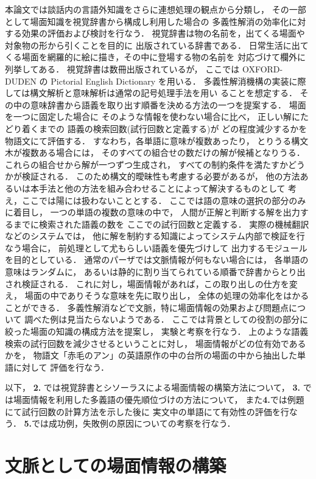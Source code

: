 本論文では談話内の言語外知識をさらに連想処理の観点から分類し，
その一部として場面知識を視覚辞書から構成し利用した場合の
多義性解消の効率化に対する効果の評価および検討を行なう．
視覚辞書は物の名前を，出てくる場面や対象物の形から引くことを目的に
出版されている辞書である．
日常生活に出てくる場面を網羅的に絵に描き，その中に登場する物の名前を
対応づけて欄外に列挙してある．
視覚辞書は数冊出版されているが，
ここでは OXFORD-DUDEN の Pictorial English Dictionary を用いる．
多義性解消機構の実装に際しては構文解析と意味解析は通常の記号処理手法を用い
ることを想定する．
その中の意味辞書から語義を取り出す順番を決める方法の一つを提案する．
場面を一つに固定した場合に
そのような情報を使わない場合に比べ，
正しい解にたどり着くまでの
語義の検索回数(試行回数と定義する)が
どの程度減少するかを物語文にて評価する．
すなわち，各単語に意味が複数あったり，
とりうる構文木が複数ある場合には，
そのすべての組合せの数だけの解が候補となりうる．
これらの組合せから解が一つずつ生成され，
すべての制約条件を満たすかどうかが検証される．
このため構文的曖昧性も考慮する必要があるが，
他の方法あるいは本手法と他の方法を組み合わせることによって解決するものとして
考え，ここでは陽には扱わないこととする．
ここでは語の意味の選択の部分のみに着目し，
一つの単語の複数の意味の中で，
人間が正解と判断する解を出力するまでに検索された語義の数を
ここでの試行回数と定義する．
実際の機械翻訳などのシステムでは，
他に解を制約する知識によってシステム内部で検証を行なう場合に，
前処理として尤もらしい語義を優先づけして
出力するモジュールを目的としている．
通常のパーザでは文脈情報が何もない場合には，
各単語の意味はランダムに，
あるいは静的に割り当てられている順番で辞書からとり出され検証される．
これに対し，場面情報があれば，この取り出しの仕方を変え，
場面の中でありそうな意味を先に取り出し，
全体の処理の効率化をはかることができる．
多義性解消などで文脈，特に場面情報の効果および問題点について
調べた例は見当たらないようである．
ここでは背景としての役割の部分に絞った場面の知識の構成方法を提案し，
実験と考察を行なう．
上のような語義検索の試行回数を減少させるということに対し，
場面情報がどの位有効であるかを，
物語文「赤毛のアン」の英語原作の中の台所の場面の中から抽出した単語に対して
評価を行なう．

以下，
{\bf 2.} では視覚辞書とシソーラスによる場面情報の構築方法について，
{\bf 3.} では場面情報を利用した多義語の優先順位づけの方法について，
また{\bf 4.}では例題にて試行回数の計算方法を示した後に
実文中の単語にて有効性の評価を行なう．
{\bf 5.}では成功例，失敗例の原因についての考察を行なう．

\section{文脈としての場面情報の構築}

